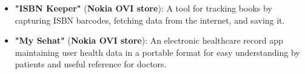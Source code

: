 \documentclass[10pt,a4paper,ragged2e,withhyper]{altacv}
\begin{document}
\begin{paracol}{2}
\divider


\divider


\begin{itemize}
  \item \textbf{"ISBN Keeper"} (\textbf{Nokia OVI store}): A tool for tracking books by capturing ISBN barcodes, fetching data from the internet, and saving it.
  \item \textbf{"My Sehat"} (\textbf{Nokia OVI store}): An electronic healthcare record app maintaining user health data in a portable format for easy understanding by patients and useful reference for doctors.
\end{itemize}

\divider






\end{paracol}
\end{document}
